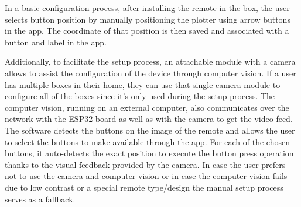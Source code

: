 In a basic configuration process, after installing the remote in the box, the user selects button position by manually positioning the plotter using arrow buttons in the app.
The coordinate of that position is then saved and associated with a button and label in the app.

Additionally, to facilitate the setup process, an attachable module with a camera allows to assist the configuration of the device through computer vision.
If a user has multiple boxes in their home, they can use that single camera module to configure all of the boxes since it's only used during the setup process.
The computer vision, running on an external computer, also communicates over the network with the ESP32 board as well as with the camera to get the video feed.
The software detects the buttons on the image of the remote and allows the user to select the buttons to make available through the app.
For each of the chosen buttons, it auto-detects the exact position to execute the button press operation thanks to the visual feedback provided by the camera.
In case the user prefers not to use the camera and computer vision or in case the computer vision fails due to low contrast or a special remote type/design the manual setup process serves as a fallback. 

